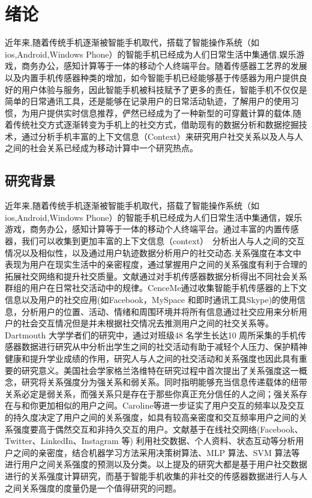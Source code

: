 \chapter{绪论}
近年来,随着传统手机逐渐被智能手机取代，搭载了智能操作系统（如ios,Android,Windows Phone）的智能手机已经成为人们日常生活中集通信,娱乐游戏，商务办公，感知计算等于一体的移动个人终端平台。随着传感器工艺界的发展以及内置手机传感器种类的增加，如今智能手机已经能够基于传感器为用户提供良好的用户体验与服务，因此智能手机被科技赋予了更多的责任，智能手机不仅仅是简单的日常通讯工具，还是能够在记录用户的日常活动轨迹，了解用户的使用习惯，为用户提供实时信息推荐，俨然已经成为了一种新型的可穿戴计算的载体,随着传统社交方式逐渐转变为手机上的社交方式，借助现有的数据分析和数据挖掘技术，通过分析手机丰富的上下文信息（Context）来研究用户社交关系以及人与人之间的社会关系已经成为移动计算中一个研究热点。

\section{研究背景}

近年来,随着传统手机逐渐被智能手机取代，搭载了智能操作系统（如ios,Android,Windows Phone）的智能手机已经成为人们日常生活中集通信，娱乐游戏，商务办公，感知计算等于一体的移动个人终端平台。通过丰富的内置传感器，我们可以收集到更加丰富的上下文信息（context）　分析出人与人之间的交互情况以及相似性，以及通过用户轨迹数据分析用户的社交动态.关系强度在本文中表现为用户在现实生活中的亲密程度，通过掌握用户之间的关系强度有利于合理的拓展社交网络和提升社交质量。文献\cite{eagle2006reality}通过对手机传感器数据分析得出不同社会关系群组的用户在日常社交活动中的规律。CenceMe通过收集智能手机传感器的上下文信息以及用户的社交应用(如Facebook，MySpace 和即时通讯工具Skype)的使用信息，分析用户的位置、活动、情绪和周围环境并将所有信息通过社交应用来分析用户的社会交互情况但是并未根据社交情况去推测用户之间的社交关系等。Dartmouth 大学学者们的研究中，通过对班级48 名学生长达10 周所采集的手机传感器数据进行研究从中分析出学生之间的社交活动有助于减轻个人压力、保护精神健康和提升学业成绩的作用，研究人与人之间的社交活动和关系强度也因此具有重要的研究意义。美国社会学家格兰洛维特在研究过程中首次提出了关系强度这一概念，研究将关系强度分为强关系和弱关系。同时指明能够充当信息传递载体的纽带关系必定是弱关系，而强关系只是存在于那些你真正充分信任的人之间；强关系存在与和你更加相似的用户之间。Caroline等进一步证实了用户交互的频率以及交互的持久度决定了用户之间的关系强度，如具有较高亲密度和交互频率用户之间的关系强度要高于偶然交互和非持久交互的用户。文献\cite{gustafson2012extracting,khadangi2013measuring,zhao2012relationship}基于在线社交网络(Facebook、Twitter、LinkedIn、Instagram 等) 利用社交数据、个人资料、状态互动等分析用户之间的亲密度，结合机器学习方法采用决策树算法、MLP 算法、SVM 算法等进行用户之间关系强度的预测以及分类。以上提及的研究大都是基于用户社交数据进行的关系强度计算研究，而基于智能手机收集的非社交的传感器数据进行人与人之间关系强度的度量仍是一个值得研究的问题。

